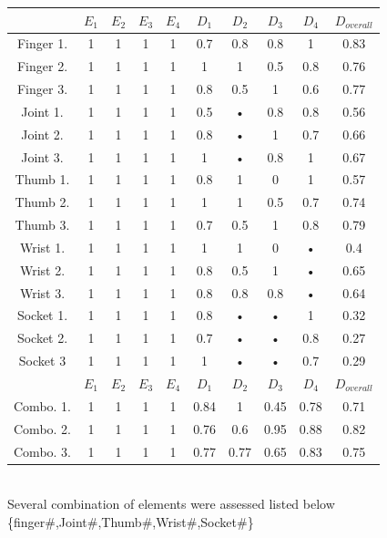 \documentclass[11pt,3p]{report}
\begin{document}
\begin{tabular}{|c|c|c|c|c|c|c|c|c||c|}
\hline 
 & $E_1$ & $E_2$ & $E_3$ & $E_4$ & $D_1$ & $D_2$ & $D_3$ & $D_4$ & $D_{overall}$ \\ 
\hline 
Finger 1. & 1 & 1 & 1 & 1 & 0.7 & 0.8 & 0.8 & 1 & 0.83\\ 
\hline 
Finger 2. & 1 & 1 & 1 & 1 & 1 & 1 & 0.5 & 0.8 & 0.76\\ 
\hline 
Finger 3. & 1 & 1 & 1 & 1 & 0.8 & 0.5 & 1 & 0.6 & 0.77\\ 
\hline 
Joint 1. & 1 & 1 & 1 & 1 & 0.5 & • & 0.8 & 0.8 & 0.56\\ 
\hline 
Joint 2. & 1 & 1 & 1 & 1 & 0.8 & • & 1 & 0.7 & 0.66\\ 
\hline 
Joint 3. & 1 & 1 & 1 & 1 & 1 & • & 0.8 & 1 & 0.67\\ 
\hline 
Thumb 1. & 1 & 1 & 1 & 1 & 0.8 & 1 & 0 & 1 & 0.57\\ 
\hline 
Thumb 2. & 1 & 1 & 1 & 1 & 1 & 1 & 0.5 & 0.7 & 0.74\\ 
\hline 
Thumb 3. & 1 & 1 & 1 & 1 & 0.7 & 0.5 & 1 & 0.8 & 0.79\\ 
\hline 
Wrist 1. & 1 & 1 & 1 & 1 & 1 & 1 & 0 & • & 0.4\\ 
\hline 
Wrist 2. & 1 & 1 & 1 & 1 & 0.8 & 0.5 & 1 & • & 0.65\\ 
\hline 
Wrist 3. & 1 & 1 & 1 & 1 & 0.8 & 0.8 & 0.8 & • & 0.64\\ 
\hline 
Socket 1. & 1 & 1 & 1 & 1 & 0.8 & • & • & 1 & 0.32\\ 
\hline 
Socket 2. & 1 & 1 & 1 & 1 & 0.7 & • & • & 0.8 & 0.27\\ 
\hline 
Socket 3 & 1 & 1 & 1 & 1 & 1 & • & • & 0.7 & 0.29\\
\hline
\hline 
 & $E_1$ & $E_2$ & $E_3$ & $E_4$ & $D_1$ & $D_2$ & $D_3$ & $D_4$ & $D_{overall}$ \\
\hline 
Combo. 1. & 1 & 1 & 1 & 1 & 0.84 & 1 & 0.45 & 0.78 & 0.71 \\ 
\hline 
Combo. 2. & 1 & 1 & 1 & 1 & 0.76 & 0.6 & 0.95 & 0.88 & 0.82 \\ 
\hline 
Combo. 3. & 1 & 1 & 1 & 1 & 0.77 & 0.77 & 0.65 & 0.83 & 0.75 \\ 
\hline 
\end{tabular}\\
Several combination of elements were assessed listed below
\{finger\#,Joint\#,Thumb\#,Wrist\#,Socket\#\}
\end{document}

